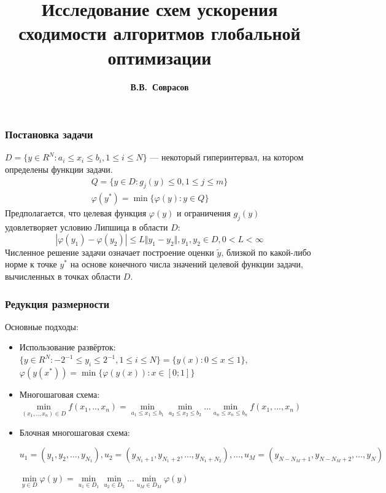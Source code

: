 \documentclass[aspectratio=1610]{beamer}
\title{Исследование схем ускорения сходимости алгоритмов глобальной оптимизации}
\author{\textbf{В.В.~Соврасов}}
\institute{ННГУ им. Н.И. Лобачевского}
\date{}
\begin{document}
\begin{frame}
\titlepage
\end{frame}

\begin{frame}
  \frametitle{Постановка задачи}
    \(D=\{y\in R^N:a_i\leqslant x_i\leqslant{b_i}, 1\leqslant{i}\leqslant{N}\}\) ---
    некоторый гиперинтервал, на котором определены функции задачи.
  \begin{displaymath}
    \begin{array}{c}
      Q=\{y\in D: g_j(y)\leqslant 0,  1\leqslant{j}\leqslant{m}\}  \\
      \varphi(y^*)=\min\{\varphi(y):y\in Q\}
    \end{array}
  \end{displaymath}
  Предполагается, что целевая функция \(\varphi(y)\) и ограничения \(g_j(y)\) удовлетворяет условию Липшица в области \(D\):
  \begin{displaymath}
  |\varphi(y_1)-\varphi(y_2)|\leqslant L\Vert y_1-y_2\Vert,y_1,y_2\in D,0<L<\infty
  \end{displaymath}
  Численное решение задачи означает построение оценки \(\widetilde{y}\), близкой по какой-либо
  норме к точке \(y^*\) на основе конечного числа значений целевой функции задачи,
  вычисленных в точках области \(D\).
\end{frame}

\begin{frame}
  \frametitle{Редукция размерности}
  Основные подходы:
  \begin{itemize}
    \item<1-> Использование развёрток:
    \(\lbrace y\in R^N:-2^{-1}\leqslant y_i\leqslant 2^{-1},1\leqslant i\leqslant N\rbrace=\{y(x):0\leqslant x\leqslant 1\}\),
    \(\varphi(y(x^*))=\min\{\varphi(y(x)):x\in [0;1]\}\)
    \item<2-> Многошаговая схема:
    \(\min\limits_{(x_1,..,x_n)\in D} f(x_1,..,x_n)=\min\limits_{a_1\le x_1\le b_1}\min\limits_{a_2\le x_2\le b_2}...\min\limits_{a_n\le x_n\le b_n} f(x_1,...,x_n)\)
    \item<3-> Блочная многошаговая схема:

    \(u_1=(y_1,y_2,\dots,y_{N_1}),u_2=(y_{N_1+1},y_{N_1+2},\dots,y_{N_1+N_2}),\dots,u_M=(y_{N-N_M+1},y_{N-N_M+2},\dots,y_N)\)

    \(\min\limits_{y\in D}\varphi(y)=\min\limits_{u_1\in D_1}\min\limits_{u_2\in D_2}\dots\min\limits_{u_M\in D_M}\varphi(y)\)
  \end{itemize}

\end{frame}
\end{document}
